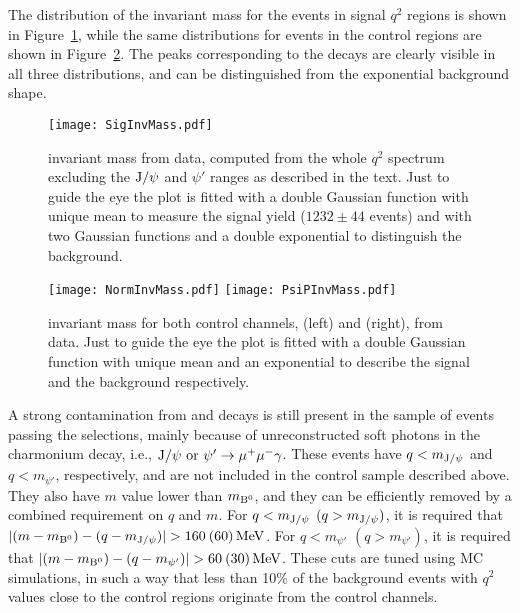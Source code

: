 The distribution of the \PBz invariant mass for the events in signal $q^2$ regions is shown in Figure~\ref{fig:sigInvMass}, while the same distributions for events in the control regions are shown in Figure~\ref{fig:normInvMass}.
The peaks corresponding to the \PBz decays are clearly visible in all three distributions, and can be distinguished from the exponential background shape.

\begin{figure}[hbt]
  \begin{center}
    \texttt{[image: SigInvMass.pdf]}
    \caption{\PBz invariant mass from data, computed from the whole $q^2$ spectrum excluding the $\textrm{J}/\psi$ and $\psi'$ ranges as described in the text.
      Just to guide the eye the plot is fitted with a double Gaussian function with unique mean to measure the signal yield
      ($1232 \pm 44$ events) and with two Gaussian functions and a double exponential to distinguish the background.}
    \label{fig:sigInvMass}
  \end{center}
\end{figure}

\begin{figure}[hbt]
  \begin{center}
    \texttt{[image: NormInvMass.pdf]}
    \texttt{[image: PsiPInvMass.pdf]}
    \caption{\PBz invariant mass for both control channels, \BtoKstJpsimumu (left) and \BtoKstpsipmumu (right), from data.
      Just to guide the eye the plot is fitted with a double Gaussian function with unique mean and an exponential to describe the signal and the background respectively.}
    \label{fig:normInvMass}
  \end{center}
\end{figure}

A strong contamination from \BtoKstJpsi and \BtoKstpsip decays is still present in the sample of events passing the selections, mainly because of unreconstructed soft photons in the charmonium decay, i.e., $\textrm{J}/\psi\ {\rm or}\ \psi' \to \mu^{+} \mu^{-} \gamma$.
These events have $q<m_{\textrm{J}/\psi}$ and $q<m_{\psi'}$, respectively, and are not included in the control sample described above.
They also have $m$ value lower than $m_{{\textrm{B}}{}^{0}}$, and they can be efficiently removed by a combined requirement on $q$ and $m$.
For $q<m_{\textrm{J}/\psi}$ $(q>m_{\textrm{J}/\psi})$, it is required that $\lvert(m-m_{{\textrm{B}}{}^{0}})-(q-m_{\textrm{J}/\psi})\rvert>160\: (60)\,\textrm{MeV}$.
For $q<m_{\psi'}$ $(q>m_{\psi'})$, it is required that $\lvert(m-m_{{\textrm{B}}{}^{0}})-(q-m_{\psi'})\rvert>60\: (30)\,\textrm{MeV}$.
These cuts are tuned using MC simulations, in such a way that less than 10\% of the background events with $q^2$ values close to the control regions originate from the control channels.

